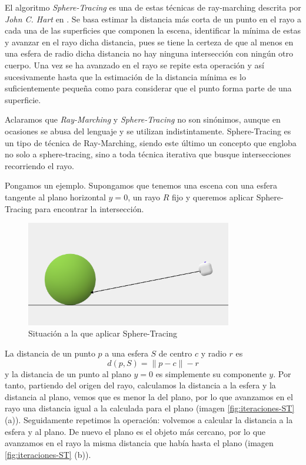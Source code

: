 El algoritmo \textit{Sphere-Tracing} es una de estas técnicas de ray-marching descrita por \textit{John C. Hart} en \cite{Hart-1995}. Se basa estimar la distancia más corta de un punto en el rayo a cada una de las superficies que componen la escena, identificar la mínima de estas y avanzar en el rayo dicha distancia, pues se tiene la certeza de que al menos en una esfera de radio dicha distancia no hay ninguna intersección con ningún otro cuerpo. Una vez se ha avanzado en el rayo se repite esta operación y así sucesivamente hasta que la estimación de la distancia mínima es lo suficientemente pequeña como para considerar que el punto forma parte de una superficie.

Aclaramos que \textit{Ray-Marching} y \textit{Sphere-Tracing} no son sinónimos, aunque en ocasiones se abusa del lenguaje y se utilizan indistintamente. Sphere-Tracing es un tipo de técnica de Ray-Marching, siendo este último un concepto que engloba no solo a sphere-tracing, sino a toda técnica iterativa que busque intersecciones recorriendo el rayo.

Pongamos un ejemplo. Supongamos que tenemos una escena con una esfera tangente al plano horizontal $y=0$, un rayo $R$ fijo y queremos aplicar Sphere-Tracing para encontrar la intersección.

\begin{figure} [ht]
    \centering
    \includegraphics[width=9cm]{img/C9/situacion-inicial.png}
    \caption{Situación a la que aplicar Sphere-Tracing}
    \label{fig:ST-inicial}
\end{figure}

La distancia de un punto $p$ a una esfera $S$ de centro $c$ y radio $r$ es 
\begin{equation}
    \label{eq:distancia-punto-esfera}
    d(p,S) = \|p-c\| - r 
\end{equation}
y la distancia de un punto al plano $y=0$ es simplemente su componente $y$. Por tanto, partiendo del origen del rayo, calculamos la distancia a la esfera y la distancia al plano, vemos que es menor la del plano, por lo que avanzamos en el rayo una distancia igual a la calculada para el plano (imagen \ref{fig:iteraciones-ST} (a)). Seguidamente repetimos la operación: volvemos a calcular la distancia a la esfera y al plano. De nuevo el plano es el objeto más cercano, por lo que avanzamos en el rayo la misma distancia que había hasta el plano (imagen \ref{fig:iteraciones-ST} (b)).

